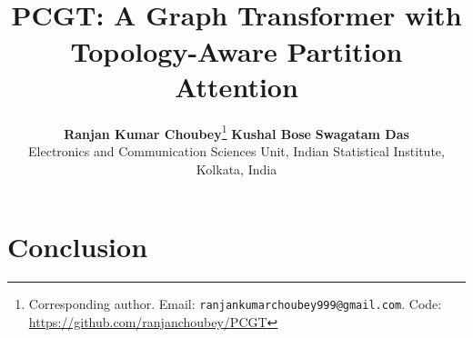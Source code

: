 \documentclass[twocolumn, 10pt]{article}
\title{\vspace{-0.5cm}{\rule{\textwidth}{1.2pt}}\vspace{0.25cm}\\
\textbf{PCGT: A Graph Transformer with Topology-Aware Partition Attention}\\
\vspace{0.25cm}{\rule{\textwidth}{1.2pt}}\vspace{-0.1cm}}
\author{
\small \textbf{Ranjan Kumar Choubey}\thanks{Corresponding author. Email: \nolinkurl{ranjankumarchoubey999@gmail.com}. Code: \url{https://github.com/ranjanchoubey/PCGT}}\quad
\small \textbf{Kushal Bose}\quad
\small \textbf{Swagatam Das} \\[3pt]
\small Electronics and Communication Sciences Unit,
Indian Statistical Institute, Kolkata, India
}
\date{\vspace{-0.3cm}}
\begin{document}
\maketitle
\vspace{0.2cm}

















\section{Conclusion}
\end{document}
